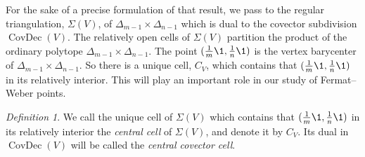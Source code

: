 \documentclass[a4paper,12pt]{amsart}
\DeclareMathOperator\CovDec{CovDec} %
\theoremstyle{remark}
\newtheorem{definition}[theorem]{Definition}
\begin{document}
For the sake of a precise formulation of that result, we pass to the regular triangulation, $\Sigma(V)$, of $\Delta_{m-1}\times\Delta_{n-1}$ which is dual to the covector subdivision $\CovDec(V)$.
The relatively open cells of $\Sigma(V)$ partition the product of the ordinary polytope $\Delta_{m-1}\times\Delta_{n-1}$.
The point $(\tfrac{1}{m}\1,\tfrac{1}{n}\1)$ is the vertex barycenter of  $\Delta_{m-1}\times\Delta_{n-1}$.
So there is a unique cell, $C_V$, which contains that $(\tfrac{1}{m}\1,\tfrac{1}{n}\1)$ in its relatively interior.
This will play an important role in our study of Fermat--Weber points.

\begin{definition}
We call the unique cell of $\Sigma(V)$ which contains that $(\tfrac{1}{m}\1,\tfrac{1}{n}\1)$ in its relatively interior the \emph{central cell} of $\Sigma(V)$, and denote it by $C_V$.
Its dual in $\CovDec(V)$ will be called the \emph{central covector cell}.
\end{definition}
\end{document}
